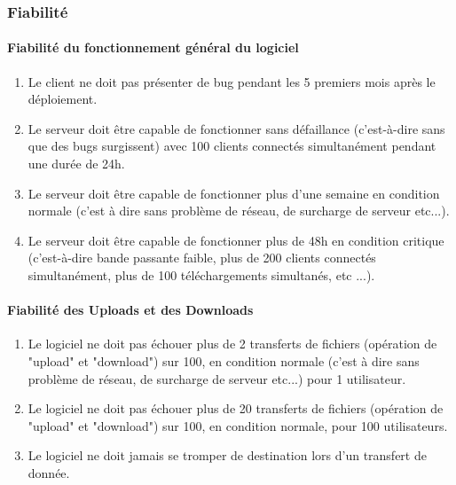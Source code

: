 \documentclass[10pt,a4paper]{report}
\begin{document}
\subsubsection{Fiabilité}

\paragraph{Fiabilité du fonctionnement général du logiciel}

	\begin{enumerate}
		\item Le client ne doit pas présenter de bug pendant les 5 premiers mois après le déploiement.
	
		\item Le serveur doit être capable de fonctionner sans défaillance (c'est-à-dire sans que des bugs surgissent) avec 100 clients connectés simultanément pendant une durée de 24h.
		
		\item Le serveur doit être capable de fonctionner plus d'une semaine en condition normale (c'est à dire sans problème de réseau, de surcharge de serveur etc...).	
		
		\item Le serveur doit être capable de fonctionner plus de 48h en condition critique (c'est-à-dire bande passante faible, plus de 200 clients connectés simultanément, plus de 100 téléchargements simultanés, etc ...).
	\end{enumerate}
	
	
\paragraph{Fiabilité des Uploads et des Downloads}
	\begin{enumerate}
		\item Le logiciel ne doit pas échouer plus de 2 transferts de fichiers (opération de "upload" et "download") sur 100, en condition normale (c'est à dire sans problème de réseau, de surcharge de serveur etc...) pour 1 utilisateur.
		
		\item Le logiciel ne doit pas échouer plus de 20 transferts de fichiers (opération de "upload" et "download") sur 100, en condition normale, pour 100 utilisateurs.
		
		\item Le logiciel ne doit jamais se tromper de destination lors d'un transfert de donnée.
	\end{enumerate}		 
\end{document}
